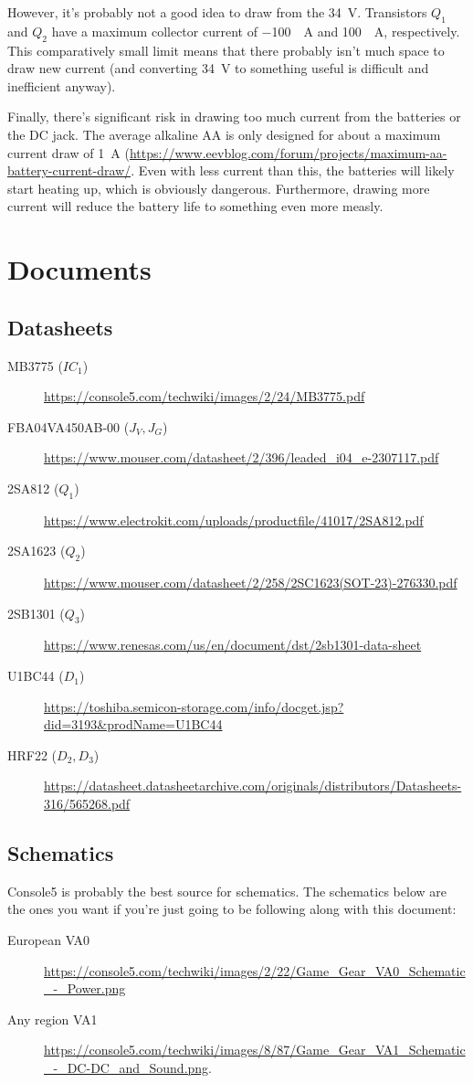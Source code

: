 \documentclass{article}
\begin{document}
However, it's probably not a good idea to draw from the
\qty{34}{\volt}. Transistors $Q_1$ and $Q_2$ have a maximum collector
current of \qty{-100}{\milli{}A} and \qty{100}{\milli{}A},
respectively. This comparatively small limit means that there probably
isn't much space to draw new current (and converting \qty{34}{\volt}
to something useful is difficult and inefficient anyway).

Finally, there's significant risk in drawing too much current from the
batteries or the DC jack. The average alkaline AA is only designed for
about a maximum current draw of \qty{1}{A}
(\url{https://www.eevblog.com/forum/projects/maximum-aa-battery-current-draw/}. Even
with less current than this, the batteries will likely start heating
up, which is obviously dangerous. Furthermore, drawing more current
will reduce the battery life to something even more measly.

\section{Documents}
\label{sec:documents}
\subsection{Datasheets}
\begin{description}
\item[MB3775 ($IC_1$)]
  \url{https://console5.com/techwiki/images/2/24/MB3775.pdf}
\item[FBA04VA450AB-00 ($J_V,J_G$)]
  \url{https://www.mouser.com/datasheet/2/396/leaded_i04_e-2307117.pdf}
\item[2SA812 ($Q_1$)]
  \url{https://www.electrokit.com/uploads/productfile/41017/2SA812.pdf}
\item[2SA1623 ($Q_2$)]
  \url{https://www.mouser.com/datasheet/2/258/2SC1623(SOT-23)-276330.pdf}
\item[2SB1301 ($Q_3$)]
  \url{https://www.renesas.com/us/en/document/dst/2sb1301-data-sheet}
\item[U1BC44 ($D_1$)]
  \url{https://toshiba.semicon-storage.com/info/docget.jsp?did=3193&prodName=U1BC44}
  
\item[HRF22 ($D_2,D_3$)]
  \url{https://datasheet.datasheetarchive.com/originals/distributors/Datasheets-316/565268.pdf}
\end{description}

\subsection{Schematics}
\label{sec:documents_schematics}
Console5 is probably the best source for schematics. The schematics
below are the ones you want if you're just going to be following along
with this document:
\begin{description}
\item[European VA0]
  \url{https://console5.com/techwiki/images/2/22/Game_Gear_VA0_Schematic_-_Power.png}
\item[Any region VA1]
  \url{https://console5.com/techwiki/images/8/87/Game_Gear_VA1_Schematic_-_DC-DC_and_Sound.png}.
\end{description}
\end{document}
